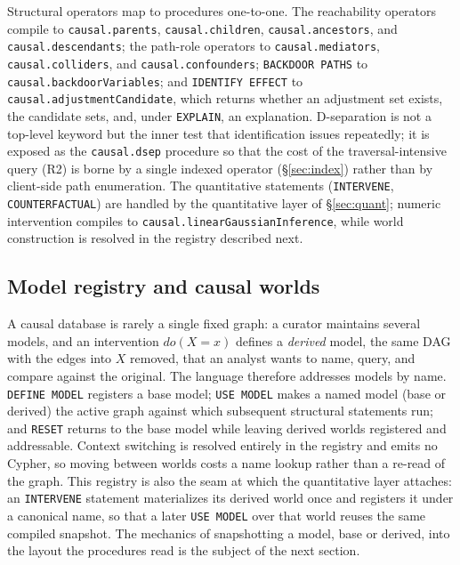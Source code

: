 Structural operators map to procedures one-to-one. The reachability operators
compile to \texttt{causal.parents}, \texttt{causal.children},
\texttt{causal.ancestors}, and \texttt{causal.descendants}; the path-role
operators to \texttt{causal.mediators}, \texttt{causal.colliders}, and
\texttt{causal.confounders}; \lstinline[style=causaldsl]|BACKDOOR PATHS| to
\texttt{causal.backdoorVariables}; and \lstinline[style=causaldsl]|IDENTIFY EFFECT|
to \texttt{causal.adjustmentCandidate}, which returns whether an adjustment set
exists, the candidate sets, and, under \lstinline[style=causaldsl]|EXPLAIN|, an
explanation. D-separation is not a top-level keyword but the inner test that
identification issues repeatedly; it is exposed as the \texttt{causal.dsep}
procedure so that the cost of the traversal-intensive query (R2) is borne by a
single indexed operator (\S\ref{sec:index}) rather than by client-side path
enumeration. The quantitative statements (\lstinline[style=causaldsl]|INTERVENE|,
\lstinline[style=causaldsl]|COUNTERFACTUAL|) are handled by the quantitative
layer of \S\ref{sec:quant}; numeric intervention compiles to
\texttt{causal.linearGaussianInference}, while world construction is resolved in
the registry described next.

\subsection{Model registry and causal worlds}\label{sec:lang:registry}

A causal database is rarely a single fixed graph: a curator maintains several
models, and an intervention $do(X{=}x)$ defines a \emph{derived} model, the same
DAG with the edges into $X$ removed, that an analyst wants to name, query, and
compare against the original. The language therefore addresses models by name.
\lstinline[style=causaldsl]|DEFINE MODEL| registers a base model;
\lstinline[style=causaldsl]|USE MODEL| makes a named model (base or derived) the
active graph against which subsequent structural statements run; and
\lstinline[style=causaldsl]|RESET| returns to the base model while leaving derived
worlds registered and addressable. Context switching is resolved entirely in the registry and emits no Cypher, so moving between worlds costs a name lookup rather than a re-read of the graph. This registry is also the seam at which the quantitative layer attaches: an \lstinline[style=causaldsl]|INTERVENE| 
statement materializes its derived world once and registers it under a canonical name, so that a later \lstinline[style=causaldsl]|USE MODEL| over that world reuses the same compiled snapshot. The mechanics of snapshotting a model, base or derived, into the layout the procedures read is the subject of the next section.
